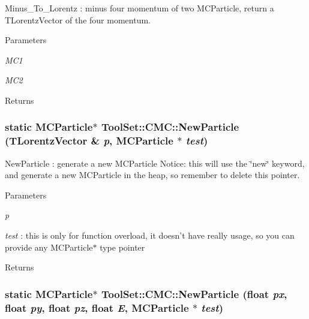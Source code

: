 Minus\_\-To\_\-Lorentz : minus four momentum of two MCParticle, return a TLorentzVector of the four momentum. 
\begin{DoxyParams}{Parameters}
\item[{\em MC1}]\item[{\em MC2}]\end{DoxyParams}
\begin{DoxyReturn}{Returns}

\end{DoxyReturn}
\hypertarget{classToolSet_1_1CMC_a5bd1a7515135570ef348bd77d1d26933}{
\subsubsection[{NewParticle}]{\setlength{\rightskip}{0pt plus 5cm}static MCParticle$\ast$ ToolSet::CMC::NewParticle (TLorentzVector \& {\em p}, \/  MCParticle $\ast$ {\em test})}}
\label{classToolSet_1_1CMC_a5bd1a7515135570ef348bd77d1d26933}


NewParticle : generate a new MCParticle Notice: this will use the \char`\"{}new\char`\"{} keyword, and generate a new MCParticle in the heap, so remember to delete this pointer. 
\begin{DoxyParams}{Parameters}
\item[{\em p}]\item[{\em test}]: this is only for function overload, it doesn't have really usage, so you can provide any MCParticle$\ast$ type pointer\end{DoxyParams}
\begin{DoxyReturn}{Returns}

\end{DoxyReturn}
\hypertarget{classToolSet_1_1CMC_ab30c29f999f2b3dd1c85ed68636f2281}{
\subsubsection[{NewParticle}]{\setlength{\rightskip}{0pt plus 5cm}static MCParticle$\ast$ ToolSet::CMC::NewParticle (float {\em px}, \/  float {\em py}, \/  float {\em pz}, \/  float {\em E}, \/  MCParticle $\ast$ {\em test})}}
\label{classToolSet_1_1CMC_ab30c29f999f2b3dd1c85ed68636f2281}



